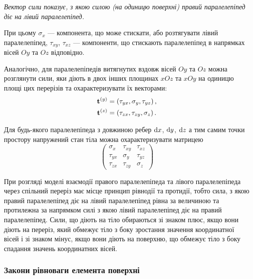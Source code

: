 \begin{definition}
	\it{Вектор сили} показує, з якою силою (на одиницю поверхні) правий паралелепіпед діє на лівий паралелепіпед.
\end{definition}

\begin{remark}
	При цьому $\sigma_x$ --- компонента, що може стискати, або розтягувати лівий паралелепіпед, $\tau_{xy}$, $\tau_{xz}$ --- компоненти, що стискають паралелепіпед в напрямках вісей $Oy$ та $Oz$ відповідно.
\end{remark}

Аналогічно, для паралелепіпедів витягнутих вздовж вісей $Oy$ та $Oz$ можна розглянути сили, яки діють в двох інших площинах $xOz$ та $xOy$ на одиницю площі цих перерізів та охарактеризувати їх векторами:
\begin{align}
	\bf{t}^{(y)} &= \left( \tau_{yx}, \sigma_y, \tau_{yz} \right), \\
	\bf{t}^{(z)} &= \left( \tau_{zx}, \tau_{zy}, \sigma_z \right).
\end{align}

Для будь-якого паралелепіпеда з довжиною ребер $\diff x$, $\diff y$, $\diff z$ а тим самим точки простору напружений стан тіла можна охарактеризувати матрицею
\begin{equation}
	\label{eq:3.2.3}
	\begin{pmatrix}
		\sigma_x & \tau_{xy} & \tau_{xz} \\
		\tau_{yx} & \sigma_y & \tau_{yz} \\
		\tau_{zx} & \tau_{zy} & \sigma_z
	\end{pmatrix}
\end{equation}

\begin{remark}
	При розгляді моделі взаємодії правого паралелепіпеда та лівого паралелепіпеда через спільний переріз має місце принцип рівнодії та протидії, тобто сила, з якою правий паралелепіпед діє на лівий паралелепіпед рівна за величиною та протилежна за напрямком силі з якою лівий паралелепіпед діє на правий паралелепіпед. Сили, що діють на тіло обираються зі знаком плюс, якщо вони діють на переріз, який обмежує тіло з боку зростання значення координатної вісей і зі знаком мінус, якщо вони діють на поверхню, що обмежує тіло з боку спадання значень координатних вісей.
\end{remark}

\subsubsection{Закони рівноваги елемента поверхні}

